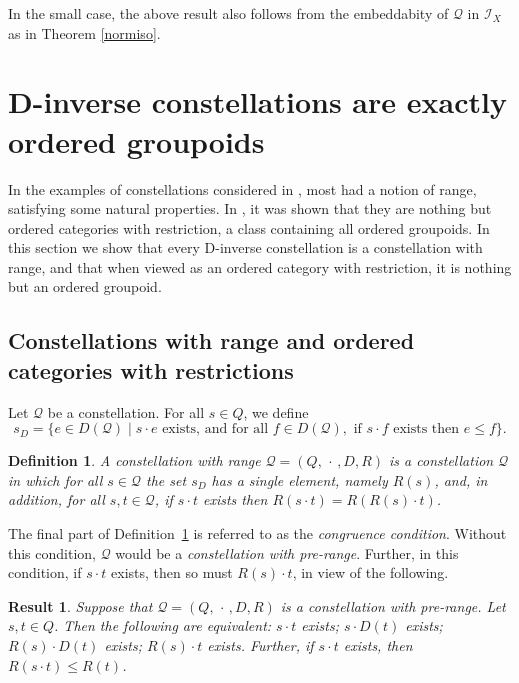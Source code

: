 \documentclass[12pt]{amsart}
\newtheorem{dfn}[thm]{Definition}
\newtheorem{result}[thm]{Result}
\theoremstyle{definition}
\newcommand{\Q}{\mathcal Q}
\newcommand{\I}{\mathcal I}
\begin{document}
In the small case, the above result also follows from the embeddabity of $\Q$ in $\I_X$ as in Theorem \ref{normiso}.


\section{D-inverse constellations are exactly ordered groupoids}  \label{sec:equiv}

In the examples of constellations considered in \cite{constgen}, most had a notion of range, satisfying some natural properties.  In \cite{constrange}, it was shown that they are nothing but ordered categories with restriction, a class containing all ordered groupoids.  In this section we show that every D-inverse constellation is a constellation with range, and that when viewed as an ordered category with restriction, it is nothing but an ordered groupoid.

\subsection{Constellations with range and ordered categories with restrictions}  \label{seclocr}

Let $\Q$ be a constellation. For all $s\in Q$, we define
$$s_D=\{e\in D(\Q)\mid s\cdot e\mbox{ exists, and for all }f\in D(\Q), \mbox{  if }s\cdot f\mbox{ exists then } e\leq f\}.$$

\begin{dfn}\label{def:range}
A {\em constellation with range} $\Q=(Q,\, \cdot\, , D, R)$ is a constellation $\Q$ in which for all $s\in \Q$ the set $s_D$ has a single element, namely $R(s)$, and, in addition, for all $s,t\in \Q$, if $s\cdot t$ exists then $R(s\cdot t)=R(R(s)\cdot t)$.
\end{dfn}  

The final part of Definition~\ref{def:range} is referred to as the {\em congruence condition}. Without this condition, $\Q$ would be a {\em constellation with pre-range}. 
Further, in this condition, if $s\cdot t$ exists, then so must $R(s)\cdot t$, in view of the following.

\begin{result} \cite{constgen}  \label{Rst}
Suppose that $\Q=(Q,\, \cdot\, ,D,R)$ is a constellation with pre-range. Let $s,t\in Q$. Then the following are equivalent:  $s\cdot t$ exists; $s\cdot D(t)$ exists; 
$R(s)\cdot D(t)$ exists; $R(s)\cdot t$ exists.  Further,   if $s\cdot t$ exists, then $R(s\cdot t)\leq R(t)$.
\end{result}  
\end{document}

